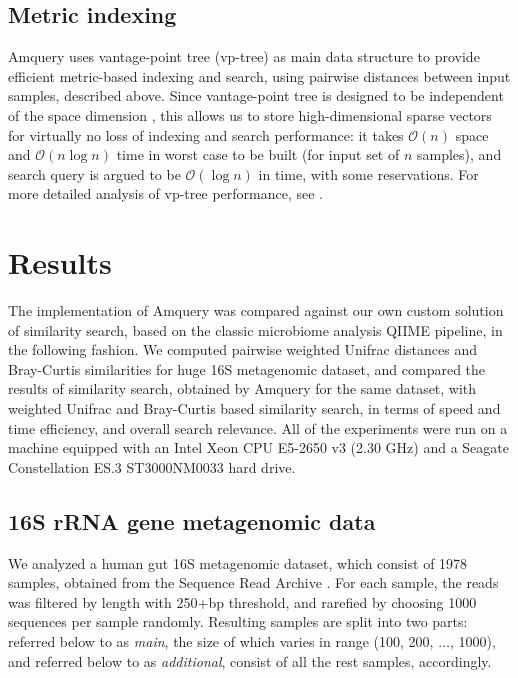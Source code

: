\documentclass[10pt,letterpaper]{article}
\begin{document}
\subsection*{Metric indexing}
Amquery uses vantage-point tree (vp-tree) \cite{yianilos1993data, chavez2001searching} as main data structure to provide efficient metric-based indexing and search, using pairwise distances between input 
samples, described above.
Since vantage-point tree is designed to be independent of the space dimension \cite{yianilos1993data}, this allows us to store high-dimensional sparse vectors for virtually no loss of indexing and 
search performance: it takes $\mathcal{O}(n)$ space and $\mathcal{O}(n \log n)$ time in worst case to be built (for input set of $n$ samples), and search query is argued to be $\mathcal{O}(\log n)$ in time, with some reservations. 
For more detailed analysis of vp-tree performance, see \cite{yianilos1993data}.


\section*{Results}
The implementation of Amquery was compared against our own custom solution of similarity search, based on the classic microbiome analysis QIIME pipeline, in the following fashion.
We computed pairwise weighted Unifrac distances \cite{lozupone2011unifrac} and Bray-Curtis similarities for huge 16S metagenomic dataset, and compared the results of similarity search, obtained by Amquery for the same dataset, with weighted Unifrac and Bray-Curtis based similarity search, in terms of speed and time efficiency, and overall search relevance. All of the experiments were run on a machine equipped with an Intel Xeon CPU E5-2650 v3 (2.30 GHz) and a 
Seagate Constellation ES.3 ST3000NM0033 hard drive.

\subsection*{16S rRNA gene metagenomic data}
We analyzed a human gut 16S metagenomic dataset, which consist of 1978 samples, obtained from the Sequence Read Archive \cite{leinonen2010sequence}. 
For each sample, the reads was filtered by length with 250+bp threshold, and rarefied by choosing 1000 sequences per sample randomly.
Resulting samples are split into two parts: referred below to as \textit{main}, the size of which varies in range (100, 200, $\dots$, 1000), and referred below to as \textit{additional}, consist of all the rest samples, accordingly. 
\end{document}
